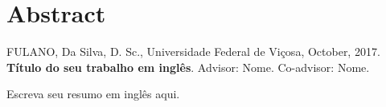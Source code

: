 \clearpage
\pagestyle{fancy}
\fancyhead{}
\fancyhead[RO,LE]{\thepage}
\fancyfoot{}
\fancyfoot[LE,RO]{}
\fancyfoot[LO,CE]{}
\fancyfoot[CO,RE]{}
\vspace*{0.7cm}
\section*{\hfill Abstract}
\vspace{1cm}
\singlespacing %

\noindent FULANO, Da Silva, D. Sc., Universidade Federal de Viçosa, October, 2017. \textbf{Título do seu trabalho em inglês}. Advisor: Nome. Co-advisor: Nome.

\bigskip

{\onehalfspacing %

\noindent Escreva seu resumo em inglês aqui. \lipsum[1-2]

}
